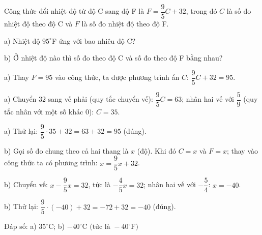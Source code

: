 \begin{problem}[8DS-PT1-012]
Công thức đổi nhiệt độ từ độ C sang độ F là $F = \dfrac{9}{5}C + 32$, trong đó $C$ là số đo nhiệt độ theo độ C và $F$ là số đo nhiệt độ theo độ F.

a) Nhiệt độ $95^\circ$F ứng với bao nhiêu độ C?

b) Ở nhiệt độ nào thì số đo theo độ C và số đo theo độ F bằng nhau?

\begin{solution}
a) Thay $F = 95$ vào công thức, ta được phương trình ẩn $C$: $\dfrac{9}{5}C + 32 = 95$.

a) Chuyển $32$ sang vế phải (quy tắc chuyển vế): $\dfrac{9}{5}C = 63$; nhân hai vế với $\dfrac{5}{9}$ (quy tắc nhân với một số khác $0$): $C = 35$.

a) Thử lại: $\dfrac{9}{5} \cdot 35 + 32 = 63 + 32 = 95$ (đúng).

b) Gọi số đo chung theo cả hai thang là $x$ (độ). Khi đó $C = x$ và $F = x$; thay vào công thức ta có phương trình: $x = \dfrac{9}{5}x + 32$.

b) Chuyển vế: $x - \dfrac{9}{5}x = 32$, tức là $-\dfrac{4}{5}x = 32$; nhân hai vế với $-\dfrac{5}{4}$: $x = -40$.

b) Thử lại: $\dfrac{9}{5} \cdot (-40) + 32 = -72 + 32 = -40$ (đúng).

Đáp số: a) $\boxed{35^\circ\text{C}}$; b) $\boxed{-40^\circ\text{C (tức là } -40^\circ\text{F)}}$
\end{solution}
\end{problem}

